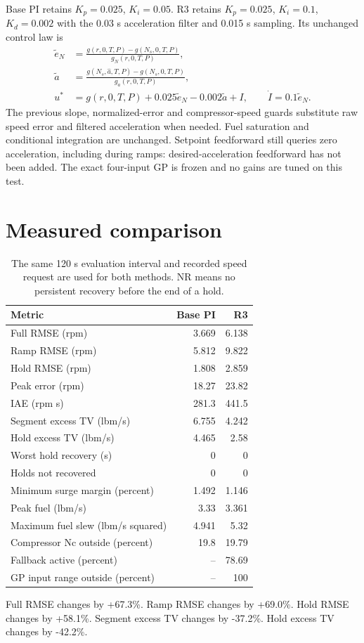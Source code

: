 \documentclass[11pt,a4paper]{article}
\begin{document}
Base PI retains $K_p=0.025$, $K_i=0.05$. R3 retains $K_p=0.025$, $K_i=0.1$, $K_d=0.002$ with the 0.03 s acceleration filter and 0.015 s sampling. Its unchanged control law is
\begin{align}
\tilde e_N&=\frac{g(r,0,T,P)-g(N_s,0,T,P)}{g_N(r,0,T,P)},\\
\tilde a&=\frac{g(N_s,\hat a,T,P)-g(N_s,0,T,P)}{g_a(r,0,T,P)},\\
u^*&=g(r,0,T,P)+0.025\tilde e_N-0.002\tilde a+I,\qquad\dot I=0.1\tilde e_N.
\end{align}
The previous slope, normalized-error and compressor-speed guards substitute raw speed error and filtered acceleration when needed. Fuel saturation and conditional integration are unchanged. Setpoint feedforward still queries zero acceleration, including during ramps: desired-acceleration feedforward has not been added. The exact four-input GP is frozen and no gains are tuned on this test.
\clearpage
\section{Measured comparison}
\begin{table}[H]\centering\small\begin{tabular}{lrr}\toprule
Metric & Base PI & R3\\\midrule
Full RMSE (rpm) & 3.669 & 6.138\\
Ramp RMSE (rpm) & 5.812 & 9.822\\
Hold RMSE (rpm) & 1.808 & 2.859\\
Peak error (rpm) & 18.27 & 23.82\\
IAE (rpm s) & 281.3 & 441.5\\
Segment excess TV (lbm/s) & 6.755 & 4.242\\
Hold excess TV (lbm/s) & 4.465 & 2.58\\
Worst hold recovery (s) & 0 & 0\\
Holds not recovered & 0 & 0\\
Minimum surge margin (percent) & 1.492 & 1.146\\
Peak fuel (lbm/s) & 3.33 & 3.361\\
Maximum fuel slew (lbm/s squared) & 4.941 & 5.32\\
Compressor Nc outside (percent) & 19.8 & 19.79\\
Fallback active (percent) & -- & 78.69\\
GP input range outside (percent) & -- & 100\\
\bottomrule\end{tabular}\caption{The same 120 s evaluation interval and recorded speed request are used for both methods. NR means no persistent recovery before the end of a hold.}\end{table}
Full RMSE changes by +67.3\%. Ramp RMSE changes by +69.0\%. Hold RMSE changes by +58.1\%. Segment excess TV changes by -37.2\%. Hold excess TV changes by -42.2\%.
\end{document}
